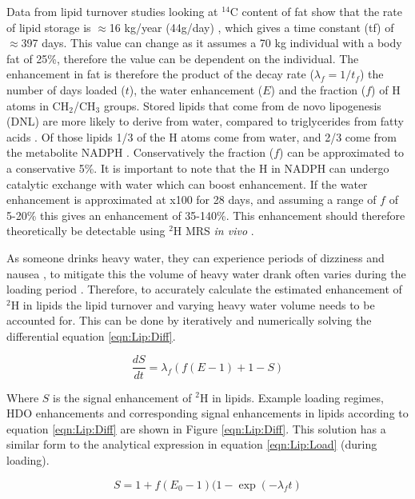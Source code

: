 \documentclass[class=article, crop=false]{standalone}
\begin{document}
Data from lipid turnover studies looking at $^{14}$C content of fat show that the rate of lipid storage is $\approx$16 kg/year (44g/day) \cite{Arner2011DynamicsDisease, Spalding2017ImpactTissue}, which gives a time constant (tf) of $\approx$397 days. This value can change as it assumes a 70 kg individual with a body fat of 25\%, therefore the value can be dependent on the individual. The enhancement in fat is therefore the product of the decay rate ($\lambda_f = 1/t_f$) the number of days loaded ($t$), the water enhancement ($E$) and the fraction ($f$) of H atoms in CH$_2$/CH$_3$ groups. Stored lipids that come from de novo lipogenesis (DNL) are more likely to derive from water, compared to triglycerides from fatty acids \cite{Strawford2004AdiposeO}. Of those lipids 1/3 of the H atoms come from water, and 2/3 come from the metabolite NADPH \cite{Zhang2017ChemicalNADPH}. Conservatively the fraction ($f$) can be approximated to a conservative 5\%. It is important to note that the H in NADPH can undergo catalytic exchange with water which can boost enhancement. If the water enhancement is approximated at x100 for 28 days, and assuming a range of $f$ of 5-20\% this gives an enhancement of 35-140\%. This enhancement should therefore theoretically be detectable using $^2$H MRS \textit{in vivo} \cite{Brereton1986PreliminarySpectroscopy}. 

As someone drinks heavy water, they can experience periods of dizziness and nausea \cite{Money1974HeavyAlcohol}, to mitigate this the volume of heavy water drank often varies during the loading period \cite{Strawford2004AdiposeO, Cocking2023DeuteriumDosing}. Therefore, to accurately calculate the estimated enhancement of $^2$H in lipids the lipid turnover and varying heavy water volume needs to be accounted for. This can be done by iteratively and numerically solving the differential equation \ref{eqn:Lip:Diff}.

\begin{equation}
    \frac{dS}{dt} = \lambda_f(f(E-1)+1-S)
    \label{eqn:Lip:Diff}
\end{equation}

Where $S$ is the signal enhancement of $^2$H in lipids. Example loading regimes, HDO enhancements and corresponding signal enhancements in lipids according to equation \ref{eqn:Lip:Diff} are shown in Figure \ref{eqn:Lip:Diff}. This solution has a similar form to the analytical expression in equation \ref{eqn:Lip:Load} (during loading).

\begin{equation}
    S = 1 + f(E_0 - 1)(1 - \exp(-\lambda_ft)
    \label{eqn:Lip:Load}
\end{equation}
\end{document}
